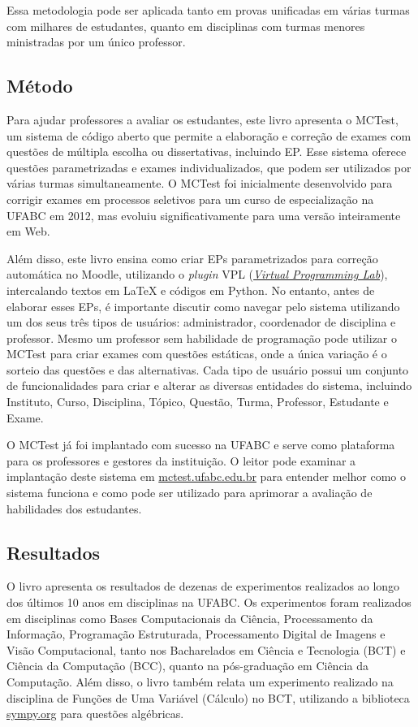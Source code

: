 Essa metodologia pode ser aplicada tanto em provas unificadas em várias turmas com milhares de estudantes, quanto em disciplinas com turmas menores ministradas por um único professor.

\subsection{Método} 
Para ajudar professores a avaliar os estudantes, este livro apresenta o MCTest, um sistema de código aberto que permite a elaboração e correção de exames com questões de múltipla escolha ou dissertativas, incluindo EP. Esse sistema oferece questões parametrizadas e exames individualizados, que podem ser utilizados por várias turmas simultaneamente. O MCTest foi inicialmente desenvolvido para corrigir exames em processos seletivos para um curso de especialização na UFABC em 2012, mas evoluiu significativamente para uma versão inteiramente em Web.

Além disso, este livro ensina como criar EPs parametrizados para correção automática no Moodle, utilizando o \textit{plugin} VPL (\href{https://vpl.dis.ulpgc.es/}{\textit{Virtual Programming Lab}}), intercalando textos em LaTeX e códigos em Python. No entanto, antes de elaborar esses EPs, é importante discutir como navegar pelo sistema utilizando um dos seus três tipos de usuários: administrador, coordenador de disciplina e professor. Mesmo um professor sem habilidade de programação pode utilizar o MCTest para criar exames com questões estáticas, onde a única variação é o sorteio das questões e das alternativas. Cada tipo de usuário possui um conjunto de funcionalidades para criar e alterar as diversas entidades do sistema, incluindo Instituto, Curso, Disciplina, Tópico, Questão, Turma, Professor, Estudante e Exame.

O MCTest já foi implantado com sucesso na UFABC e serve como plataforma para os professores e gestores da instituição. O leitor pode examinar a implantação deste sistema em \href{http://mctest.ufabc.edu.br}{mctest.ufabc.edu.br} para entender melhor como o sistema funciona e como pode ser utilizado para aprimorar a avaliação de habilidades dos estudantes.

\subsection{Resultados} 
O livro apresenta os resultados de dezenas de experimentos realizados ao longo dos últimos 10 anos em disciplinas na UFABC. Os experimentos foram realizados em disciplinas como Bases Computacionais da Ciência, Processamento da Informação, Programação Estruturada, Processamento Digital de Imagens e Visão Computacional, tanto nos Bacharelados em Ciência e Tecnologia (BCT) e Ciência da Computação (BCC), quanto na pós-graduação em Ciência da Computação. Além disso, o livro também relata um experimento realizado na disciplina de Funções de Uma Variável (Cálculo) no BCT, utilizando a biblioteca \href{http://sympy.org}{sympy.org} para questões algébricas.


